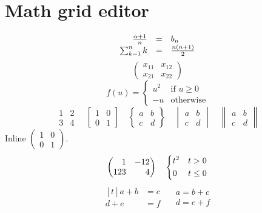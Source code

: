 \documentclass{article}
\begin{document}
\section*{Math grid editor}
\[
\begin{array}[t]{rcl}
  \frac{\alpha+1}{n} & = & b_n \\
  \sum_{k=1}^{n} k & = & \frac{n(n+1)}{2}
\end{array}
\]
\[
\begin{pmatrix}
  x_{11} & x_{12} \\
  x_{21} & x_{22}
\end{pmatrix}
\]
\[
f(u)=\begin{cases}
  u^2 & \text{if } u \geq 0 \\
  -u & \text{otherwise}
\end{cases}
\]
\[
\begin{matrix}1 & 2\\3 & 4\end{matrix}
\quad\begin{bmatrix}1 & 0\\0 & 1\end{bmatrix}
\quad\begin{Bmatrix}a & b\\c & d\end{Bmatrix}
\quad\begin{vmatrix}a & b\\c & d\end{vmatrix}
\quad\begin{Vmatrix}a & b\\c & d\end{Vmatrix}
\]
Inline $\left(\begin{smallmatrix}1 & 0\\0 & 1\end{smallmatrix}\right)$.
\[
\begin{pmatrix*}[r]1 & -12\\123 & 4\end{pmatrix*}
\quad\begin{dcases}t^2 & t>0\\0 & t\leq0\end{dcases}
\]
\[
\begin{aligned}[t]
  a+b &= c \\
  d+e &= f
\end{aligned}
\quad\begin{gathered}a=b+c\\d=e+f\end{gathered}
\]
\end{document}
